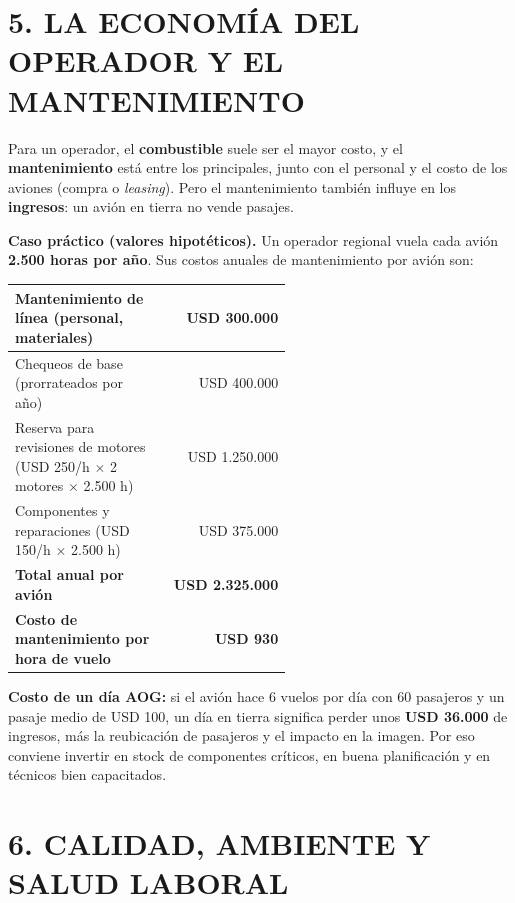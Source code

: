 \section*{5. LA ECONOMÍA DEL OPERADOR Y EL MANTENIMIENTO}

Para un operador, el \textbf{combustible} suele ser el mayor costo, y el \textbf{mantenimiento}
está entre los principales, junto con el personal y el costo de los aviones (compra o
\textit{leasing}). Pero el mantenimiento también influye en los \textbf{ingresos}: un avión en
tierra no vende pasajes.

\begin{recuadro}
\textbf{Caso práctico (valores hipotéticos).} Un operador regional vuela cada avión
\textbf{2.500 horas por año}. Sus costos anuales de mantenimiento por avión son:
\begin{center}
\begin{tabular}{|p{0.55\linewidth}|r|}
\hline
Mantenimiento de línea (personal, materiales) & USD 300.000 \\ \hline
Chequeos de base (prorrateados por año) & USD 400.000 \\ \hline
Reserva para revisiones de motores (USD 250/h $\times$ 2 motores $\times$ 2.500 h) &
USD 1.250.000 \\ \hline
Componentes y reparaciones (USD 150/h $\times$ 2.500 h) & USD 375.000 \\ \hline
\textbf{Total anual por avión} & \textbf{USD 2.325.000} \\ \hline
\textbf{Costo de mantenimiento por hora de vuelo} & \textbf{USD 930} \\ \hline
\end{tabular}
\end{center}
\textbf{Costo de un día AOG:} si el avión hace 6 vuelos por día con 60 pasajeros y un pasaje
medio de USD 100, un día en tierra significa perder unos \textbf{USD 36.000} de ingresos, más la
reubicación de pasajeros y el impacto en la imagen. Por eso conviene invertir en stock de
componentes críticos, en buena planificación y en técnicos bien capacitados.
\end{recuadro}

\section*{6. CALIDAD, AMBIENTE Y SALUD LABORAL}

